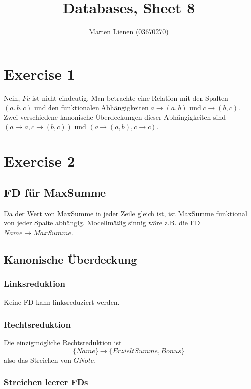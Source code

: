 \documentclass[10pt,a4paper]{article}
\title{Databases, Sheet 8}
\author{Marten Lienen (03670270)}
\begin{document}
\maketitle

\section*{Exercise 1}

Nein, $Fc$ ist nicht eindeutig.
Man betrachte eine Relation mit den Spalten $(a, b, c)$ und den funktionalen Abhängigkeiten $a \rightarrow (a, b)$ und $c \rightarrow (b, c)$.
Zwei verschiedene kanonische Überdeckungen dieser Abhängigkeiten sind $(a \rightarrow a, c \rightarrow (b, c))$ und $(a \rightarrow (a, b), c \rightarrow c)$.

\section*{Exercise 2}

\subsection*{FD für MaxSumme}

Da der Wert von MaxSumme in jeder Zeile gleich ist, ist MaxSumme funktional von jeder Spalte abhängig.
Modellmäßig sinnig wäre z.B. die FD $Name \rightarrow MaxSumme$.

\subsection*{Kanonische Überdeckung}

\subsubsection*{Linksreduktion}

Keine FD kann linksreduziert werden.

\subsubsection*{Rechtsreduktion}

Die einzigmögliche Rechtsreduktion ist
\begin{equation*}
  \{ Name \} \rightarrow \{ ErzieltSumme, Bonus \}
\end{equation*}
also das Streichen von $GNote$.

\subsubsection*{Streichen leerer FDs}
\end{document}
